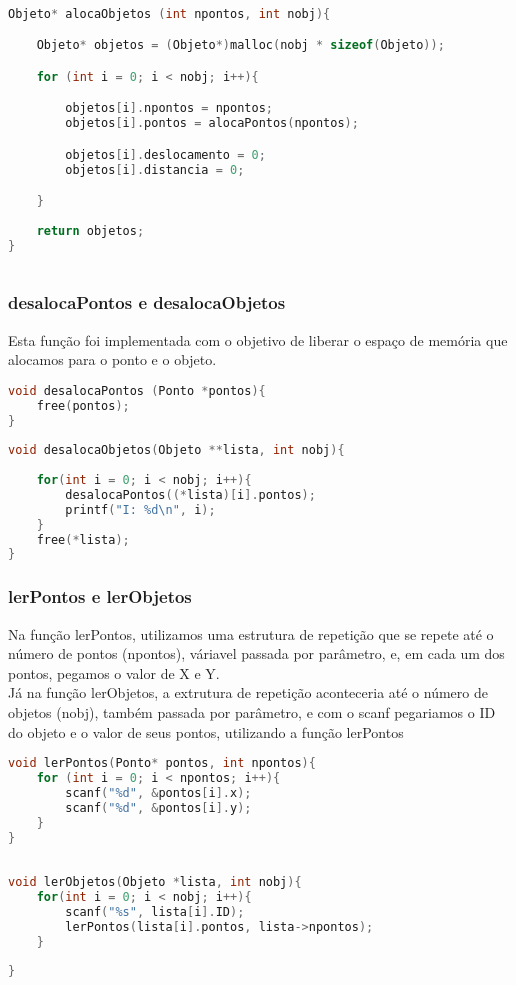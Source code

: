 \documentclass{article}
\begin{document}
\begin{lstlisting}[caption={Função alocaObjetos},label={lst:cod3},language=C]

Objeto* alocaObjetos (int npontos, int nobj){

    Objeto* objetos = (Objeto*)malloc(nobj * sizeof(Objeto));

    for (int i = 0; i < nobj; i++){

        objetos[i].npontos = npontos;
        objetos[i].pontos = alocaPontos(npontos);

        objetos[i].deslocamento = 0;
        objetos[i].distancia = 0;

    }
    
    return objetos;
}
    
    \end{lstlisting}

\subsubsection{desalocaPontos e desalocaObjetos}
Esta função foi implementada com o objetivo de liberar o espaço de memória que alocamos para o ponto e o objeto.

\begin{lstlisting}[caption={Funções desalocaPontos e desalocaObjetos},label={lst:cod4},language=C]
void desalocaPontos (Ponto *pontos){
    free(pontos);
}
    
void desalocaObjetos(Objeto **lista, int nobj){
    
    for(int i = 0; i < nobj; i++){
        desalocaPontos((*lista)[i].pontos);
        printf("I: %d\n", i);
    }
    free(*lista);
}

\end{lstlisting}


\subsubsection{lerPontos e lerObjetos}

Na função lerPontos, utilizamos uma estrutura de repetição que se repete até o número de pontos (npontos), váriavel passada por parâmetro, e, em cada um dos pontos, pegamos o valor de X e Y.
\\Já na função lerObjetos, a extrutura de repetição aconteceria até o número de objetos (nobj), também passada por parâmetro, e com o scanf pegariamos o ID do objeto e o valor de seus pontos, utilizando a função lerPontos

\begin{lstlisting}[caption={Funções lerPontos e lerObjetos},label={lst:cod5},language=C]
void lerPontos(Ponto* pontos, int npontos){
    for (int i = 0; i < npontos; i++){
        scanf("%d", &pontos[i].x);
        scanf("%d", &pontos[i].y);
    }
}
    
    
void lerObjetos(Objeto *lista, int nobj){
    for(int i = 0; i < nobj; i++){
        scanf("%s", lista[i].ID);
        lerPontos(lista[i].pontos, lista->npontos);
    }
        
}

\end{lstlisting}
\end{document}

